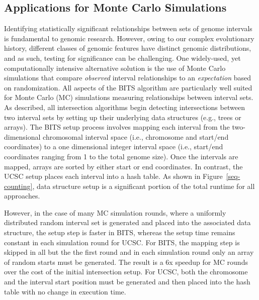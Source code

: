 \documentclass{bioinfo}
\begin{document}
\subsection{Applications for Monte Carlo Simulations}

Identifying statistically significant relationships between sets of genome
intervals is fundamental to genomic research. However, owing to our complex 
evolutionary history, different classes of genomic features have distinct
genomic distributions, and as such, testing for significance can be challenging. 
One widely-used, yet computationally intensive alternative solution is the 
use of Monte Carlo simulations that compare \emph{observed} interval 
relationships to an \emph{expectation} based on randomization. 
All aspects of the BITS algorithm are particularly well suited for Monte Carlo
(MC) simulations measuring relationships between interval sets. As described,
all intersection algorithms begin detecting intersections between two interval
sets by setting up their underlying data structures (e.g., trees or arrays). The 
BITS setup process
involves mapping each interval from the two-dimensional chromosomal interval
space (i.e., chromosome and start/end coordinates) to a one dimensional integer
interval space (i.e., start/end coordinates ranging from 1 to the total genome
size). Once the intervals are mapped, arrays are sorted by either start or
end coordinates.  In contrast, the UCSC setup places each interval into a hash 
table.  As shown in Figure~\ref{seq-counting}, data
structure setup is a significant portion of the total runtime for all
approaches. 

However, in the case of many MC simulation rounds, where a uniformly distributed
random interval set is generated and placed into the associated data structure,
the setup step is faster in BITS, whereas the setup time remains constant in
each simulation round for UCSC.  For BITS, the mapping step is skipped in all
but the the first round and in each simulation round only an array of random
starts must be generated. The result is a 6x speedup for MC rounds over the
cost of the initial intersection setup.  For UCSC, both the chromosome and the
interval start position must be generated and then placed into the hash table
with no change in execution time.
\end{document}

